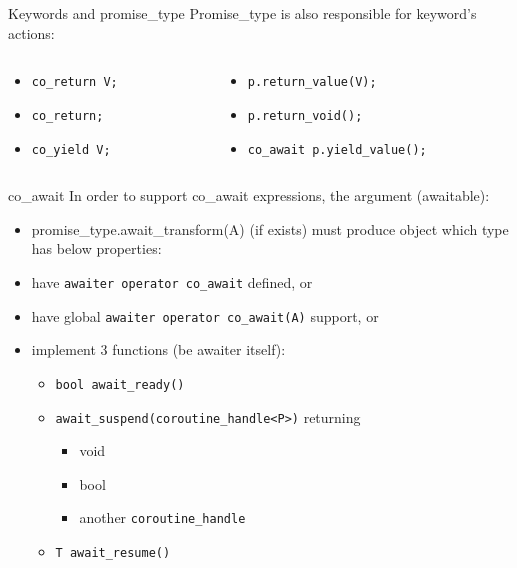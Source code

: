 \documentclass[10pt]{beamer}
\begin{document}
\begin{frame}{Keywords and promise\_type}
	Promise\_type is also responsible for keyword's actions:
	\vfill

	\begin{columns}
		\begin{column}{0.48\linewidth}
			\begin{footnotesize}
			\begin{itemize}[<+-|alert@+>]
				\item \texttt{co\_return V;}
				\item \texttt{co\_return;}
				\item \texttt{co\_yield V;}
			\end{itemize}
			\end{footnotesize}	
		\end{column}
		\begin{column}{0.48\linewidth}
			\begin{footnotesize}
			\begin{itemize}[<+-|alert@+>]
				\item<1- |alert@1> \texttt{p.return\_value(V);}
				\item<2- |alert@2> \texttt{p.return\_void();}
				\item<3- |alert@3> \texttt{co\_await p.yield\_value();}
			\end{itemize}
			\end{footnotesize}	
		\end{column}
	\end{columns}
\end{frame}

\begin{frame}{co\_await}
	In order to support \alert{co\_await} expressions, the argument (awaitable):
	\begin{itemize}[<+-|alert@+>]
	    \item promise\_type.await\_transform(A) (if exists) must produce object which type has below properties:
		\item have \texttt{awaiter operator co\_await} defined, or
		\item have global \texttt{awaiter operator co\_await(A)} support, or
		\item implement 3 functions (be awaiter itself):
		\begin{itemize}
			\item \texttt{bool await\_ready()}
			\item \texttt{await\_suspend(coroutine\_handle<P>)} returning
			\begin{itemize}
				\item void 
				\item bool
				\item another \texttt{coroutine\_handle}
			\end{itemize}
			\item \texttt{T await\_resume()}
		\end{itemize}
	\end{itemize}
\end{frame}
\end{document}
